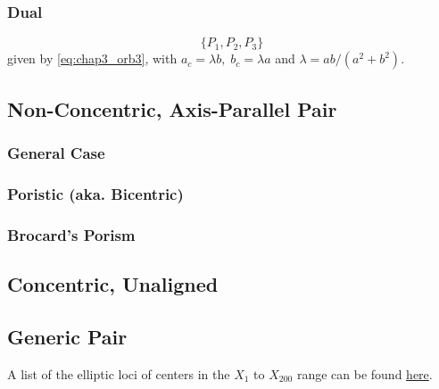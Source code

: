 \subsubsection{Dual}
 \[ \{ P_1,P_2,P_3\} \] given by \cref{eq:chap3_orb3}, with $a_c=\lambda b,\; b_c=\lambda a$ and $\lambda= a b/(a^2+b^2)$.
 
\subsection{Non-Concentric, Axis-Parallel Pair}

\subsubsection{General Case}

\subsubsection*{Poristic (aka. Bicentric)}


\subsubsection*{Brocard's Porism}

\subsection{Concentric, Unaligned}

\subsection{Generic Pair}

A list of the elliptic loci of centers in the $X_{1}$ to $X_{200}$ range can be found \href{https://dan-reznik.github.io/why-so-many-ellipses/}{here}.